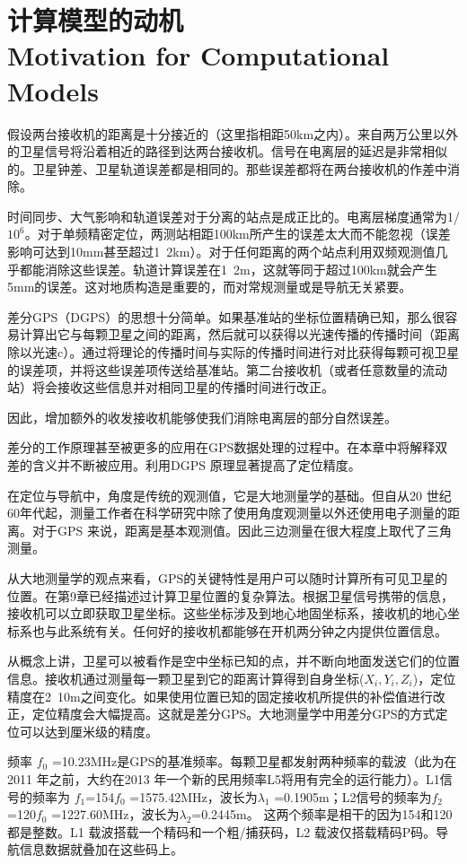 \section[计算模型的动机]{计算模型的动机\\Motivation for Computational Models}

假设两台接收机的距离是十分接近的（这里指相距50km之内）。来自两万公里以外的卫星信号将沿着相近的路径到达两台接收机。信号在电离层的延迟是非常相似的。卫星钟差、卫星轨道误差都是相同的。那些误差都将在两台接收机的作差中消除。

时间同步、大气影响和轨道误差对于分离的站点是成正比的。电离层梯度通常为1/$10^{6}$。对于单频精密定位，两测站相距100km所产生的误差太大而不能忽视（误差影响可达到10mm甚至超过1~2km）。对于任何距离的两个站点利用双频观测值几乎都能消除这些误差。轨道计算误差在1~2m，这就等同于超过100km就会产生5mm的误差。这对地质构造是重要的，而对常规测量或是导航无关紧要。

差分GPS（DGPS）的思想十分简单。如果基准站的坐标位置精确已知，那么很容易计算出它与每颗卫星之间的距离，然后就可以获得以光速传播的传播时间（距离除以光速c）。通过将理论的传播时间与实际的传播时间进行对比获得每颗可视卫星的误差项，并将这些误差项传送给基准站。第二台接收机（或者任意数量的流动站）将会接收这些信息并对相同卫星的传播时间进行改正。

因此，增加额外的收发接收机能够使我们消除电离层的部分自然误差。

差分的工作原理甚至被更多的应用在GPS数据处理的过程中。在本章中将解释双差的含义并不断被应用。利用DGPS 原理显著提高了定位精度。

在定位与导航中，角度是传统的观测值，它是大地测量学的基础。但自从20 世纪60年代起，测量工作者在科学研究中除了使用角度观测量以外还使用电子测量的距离。对于GPS 来说，距离是基本观测值。因此三边测量在很大程度上取代了三角测量。

从大地测量学的观点来看，GPS的关键特性是用户可以随时计算所有可见卫星的位置。在第9章已经描述过计算卫星位置的复杂算法。根据卫星信号携带的信息，接收机可以立即获取卫星坐标。这些坐标涉及到地心地固坐标系，接收机的地心坐标系也与此系统有关。任何好的接收机都能够在开机两分钟之内提供位置信息。

从概念上讲，卫星可以被看作是空中坐标已知的点，并不断向地面发送它们的位置信息。接收机通过测量每一颗卫星到它的距离计算得到自身坐标($X_{i},Y_{i},Z_{i}$)，定位精度在2~10m之间变化。如果使用位置已知的固定接收机所提供的补偿值进行改正，定位精度会大幅提高。这就是差分GPS。大地测量学中用差分GPS的方式定位可以达到厘米级的精度。

频率 $f_{0}$ =10.23MHz是GPS的基准频率。每颗卫星都发射两种频率的载波（此为在2011 年之前，大约在2013 年一个新的民用频率L5将用有完全的运行能力）。L1信号的频率为 $f_{1}$=154$f_{0}$ =1575.42MHz，波长为$\lambda_{1}$ =0.1905m；L2信号的频率为$f_{2}$=120$f_{0}$ =1227.60MHz，波长为$\lambda_{2}$=0.2445m。 这两个频率是相干的因为154和120都是整数。L1 载波搭载一个精码和一个粗/捕获码，L2 载波仅搭载精码P码。导航信息数据就叠加在这些码上。

